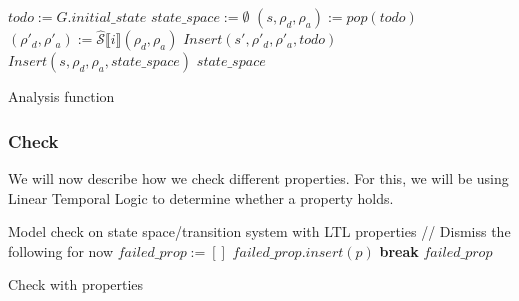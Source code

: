 \begin{algorithm}[htb!]
    \begin{codebox}
        \li $todo := G.initial\_state$
        \li $state\_space := \emptyset$
        \li {}
        \li \Do
        $(s,\rho_d,\rho_a):=pop(todo)$
        \li {}
        \li \Do $(\rho'_d,\rho'_a):=\widehat{\mathcal{S}}\llbracket i\rrbracket(\rho_d,\rho_a)$
        \li {}
        \li \Do $Insert(s',\rho'_d,\rho'_a,todo)$
        \EndIf
        \End
        \li $Insert(s,\rho_d,\rho_a,state\_space)$
        \EndFor
        \End
        \EndWhile
        \End
        \li \Return $state\_space$
    \end{codebox}
    \caption{Analysis function}
    \label{alg:analysis}

\end{algorithm}

\subsubsection{Check}\label{subsubsec:check}

We will now describe how we check different properties.
For this, we will be using Linear Temporal Logic to determine whether a property holds.

\begin{algorithm}[htb!]
    \begin{codebox}
        \li Model check on state space/transition system with LTL properties
        \li // Dismiss the following for now
        \li $failed\_prop := []$
        \li {}
        \li \Do {}
        \li \Do {}
        \li \Do $failed\_prop.insert(p)$
        \EndIf
        \End
        \li \textbf{break}
        \EndFor
        \End
        \EndFor
        \End
        \li \Return $failed\_prop$
    \end{codebox}
    \caption{Check with properties}
    \label{alg:check}
\end{algorithm}